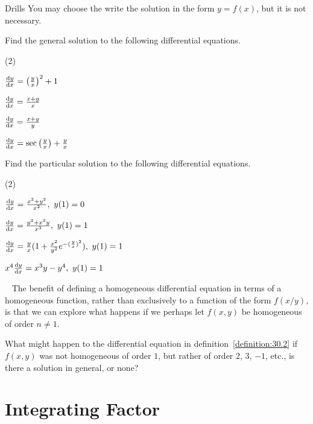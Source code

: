 \documentclass[../../main.tex]{subfiles}
\begin{document}
\begin{questions}{Drills}
You may choose the write the solution in the form $y=f(x)$, but it is not necessary.

\vspace{5pt}
Find the general solution to the following differential equations.
\vspace{5pt}
\begin{question_set}(2)
\item $\dv{y}{x}=\left(\frac{y}{x}\right)^2+1$
\item $\dv{y}{x}=\frac{x+y}{x}$ \\
\item $\dv{y}{x}=\frac{x+y}{y}$
\item $\dv{y}{x}=\sec\left(\frac{y}{x}\right)+\frac{y}{x}$
\end{question_set}
\vspace{5pt}
Find the particular solution to the following differential equations.
\vspace{5pt}
\begin{question_set}(2)
\item $\dv{y}{x}=\frac{x^2+y^2}{x^2}, \ y(1)=0$
\item $\dv{y}{x}=\frac{y^3+x^2y}{x^3}, \ y(1)=1$ \\
\item $\dv{y}{x}=\frac{y}{x}(1+\frac{x^2}{y^2}e^{-(\frac{y}{x})^2}), \ y(1)=1$
\item $x^4\dv{y}{x}=x^3y-y^4, \ y(1)=1$ \\
\end{question_set}
\end{questions}

\begin{thinking}{~}
The benefit of defining a homogeneous differential equation in terms of a homogeneous function, rather than exclusively to a function of the form $f(x/y)$, is that we can explore what happens if we perhaps let $f(x,y)$ be homogeneous of order $n \neq 1$. \vspace{10pt}

What might happen to the differential equation in definition~\ref{definition:30.2} if $f(x,y)$ was not homogeneous of order $1$, but rather of order $2$, $3$, $-1$, etc., is there a solution in general, or none?
\end{thinking}

\section{Integrating Factor}
\end{document}
